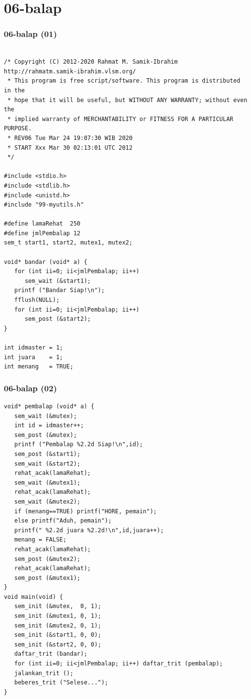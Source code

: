\documentclass[aspectratio=169, xcolor=table, notheorems, hyperref={pdfpagelabels=false}]{beamer}
\begin{document}
\section{06-balap}
\begin{frame}[fragile]
\frametitle{06-balap (01)}
\begin{lstlisting}[basicstyle=\ttfamily\tiny]

/* Copyright (C) 2012-2020 Rahmat M. Samik-Ibrahim http://rahmatm.samik-ibrahim.vlsm.org/
 * This program is free script/software. This program is distributed in the 
 * hope that it will be useful, but WITHOUT ANY WARRANTY; without even the 
 * implied warranty of MERCHANTABILITY or FITNESS FOR A PARTICULAR PURPOSE.
 * REV06 Tue Mar 24 19:07:30 WIB 2020
 * START Xxx Mar 30 02:13:01 UTC 2012
 */

#include <stdio.h>
#include <stdlib.h>
#include <unistd.h>
#include "99-myutils.h"

#define lamaRehat  250
#define jmlPembalap 12
sem_t start1, start2, mutex1, mutex2;

void* bandar (void* a) {
   for (int ii=0; ii<jmlPembalap; ii++)
      sem_wait (&start1);
   printf ("Bandar Siap!\n");
   fflush(NULL);
   for (int ii=0; ii<jmlPembalap; ii++)
      sem_post (&start2);
}

int idmaster = 1;
int juara    = 1;
int menang   = TRUE;

\end{lstlisting}
\end{frame}

\begin{frame}[fragile]
\frametitle{06-balap (02)}
\begin{lstlisting}[basicstyle=\ttfamily\tiny]
void* pembalap (void* a) {
   sem_wait (&mutex);
   int id = idmaster++;
   sem_post (&mutex);
   printf ("Pembalap %2.2d Siap!\n",id);
   sem_post (&start1);
   sem_wait (&start2);
   rehat_acak(lamaRehat);
   sem_wait (&mutex1);
   rehat_acak(lamaRehat);
   sem_wait (&mutex2);
   if (menang==TRUE) printf("HORE, pemain");
   else printf("Aduh, pemain");
   printf(" %2.2d juara %2.2d!\n",id,juara++);
   menang = FALSE;
   rehat_acak(lamaRehat);
   sem_post (&mutex2);
   rehat_acak(lamaRehat);
   sem_post (&mutex1);
}
void main(void) {
   sem_init (&mutex,  0, 1);
   sem_init (&mutex1, 0, 1);
   sem_init (&mutex2, 0, 1);
   sem_init (&start1, 0, 0);
   sem_init (&start2, 0, 0);
   daftar_trit (bandar);
   for (int ii=0; ii<jmlPembalap; ii++) daftar_trit (pembalap);
   jalankan_trit ();
   beberes_trit ("Selese...");
}

\end{lstlisting}
\end{frame}
\end{document}
